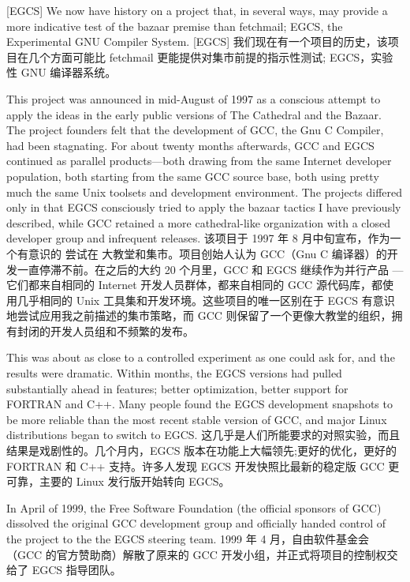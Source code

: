\documentclass[a4paper,12pt,UTF8,twoside]{ctexbook}
\begin{document}
[EGCS] We now have history on a project that, in several ways, may provide a more indicative test of the bazaar premise than fetchmail; EGCS, the Experimental GNU Compiler System.
[EGCS] 我们现在有一个项目的历史，该项目在几个方面可能比 fetchmail 更能提供对集市前提的指示性测试; EGCS，实验性 GNU 编译器系统。

This project was announced in mid-August of 1997 as a conscious attempt to apply the ideas in the early public versions of The Cathedral and the Bazaar. The project founders felt that the development of GCC, the Gnu C Compiler, had been stagnating. For about twenty months afterwards, GCC and EGCS continued as parallel products—both drawing from the same Internet developer population, both starting from the same GCC source base, both using pretty much the same Unix toolsets and development environment. The projects differed only in that EGCS consciously tried to apply the bazaar tactics I have previously described, while GCC retained a more cathedral-like organization with a closed developer group and infrequent releases.
该项目于 1997 年 8 月中旬宣布，作为一个有意识的 尝试在 大教堂和集市。项目创始人认为 GCC（Gnu C 编译器）的开发一直停滞不前。在之后的大约 20 个月里，GCC 和 EGCS 继续作为并行产品 — 它们都来自相同的 Internet 开发人员群体，都来自相同的 GCC 源代码库，都使用几乎相同的 Unix 工具集和开发环境。这些项目的唯一区别在于 EGCS 有意识地尝试应用我之前描述的集市策略，而 GCC 则保留了一个更像大教堂的组织，拥有封闭的开发人员组和不频繁的发布。

This was about as close to a controlled experiment as one could ask for, and the results were dramatic. Within months, the EGCS versions had pulled substantially ahead in features; better optimization, better support for FORTRAN and C++. Many people found the EGCS development snapshots to be more reliable than the most recent stable version of GCC, and major Linux distributions began to switch to EGCS.
这几乎是人们所能要求的对照实验，而且结果是戏剧性的。几个月内，EGCS 版本在功能上大幅领先;更好的优化，更好的 FORTRAN 和 C++ 支持。许多人发现 EGCS 开发快照比最新的稳定版 GCC 更可靠，主要的 Linux 发行版开始转向 EGCS。

In April of 1999, the Free Software Foundation (the official sponsors of GCC) dissolved the original GCC development group and officially handed control of the project to the the EGCS steering team.
1999 年 4 月，自由软件基金会（GCC 的官方赞助商）解散了原来的 GCC 开发小组，并正式将项目的控制权交给了 EGCS 指导团队。
\end{document}
